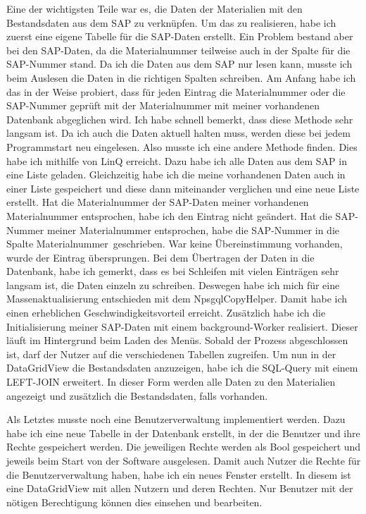 \documentclass{Vorlage}
\begin{document}
Eine der wichtigsten Teile war es, die Daten der Materialien mit den Bestandsdaten aus dem SAP zu
verknüpfen. Um das zu realisieren, habe ich zuerst eine eigene Tabelle für die SAP-Daten erstellt. 
Ein Problem bestand aber bei den SAP-Daten, da die Materialnummer teilweise auch in der Spalte für die 
SAP-Nummer stand. Da ich die Daten aus dem SAP nur lesen kann, musste ich beim Auslesen die Daten 
in die richtigen Spalten schreiben. Am Anfang habe ich das in der Weise probiert, dass für jeden Eintrag
die Materialnummer oder die SAP-Nummer geprüft mit der Materialnummer mit meiner vorhandenen Datenbank 
abgeglichen wird. Ich habe schnell bemerkt, dass diese Methode sehr langsam ist. Da ich auch die Daten 
aktuell halten muss, werden diese bei jedem Programmstart neu eingelesen. 
Also musste ich eine andere Methode finden. Dies habe ich mithilfe von LinQ erreicht.
Dazu habe ich alle Daten aus dem SAP in eine Liste geladen. Gleichzeitig habe ich die meine vorhandenen
Daten auch in einer Liste gespeichert und diese dann miteinander verglichen und eine neue Liste erstellt.
Hat die Materialnummer der SAP-Daten meiner vorhandenen Materialnummer entsprochen, habe ich den Eintrag 
nicht geändert. Hat die SAP-Nummer meiner Materialnummer entsprochen, habe die SAP-Nummer in die Spalte
\glqq Materialnummer\grqq \, geschrieben. War keine Übereinstimmung vorhanden, wurde der Eintrag übersprungen.
Bei dem Übertragen der Daten in die Datenbank, habe ich gemerkt, dass es bei Schleifen mit vielen Einträgen
sehr langsam ist, die Daten einzeln zu schreiben. Deswegen habe ich mich für eine Massenaktualisierung
entschieden mit dem NpsgqlCopyHelper.
Damit habe ich einen erheblichen Geschwindigkeitsvorteil erreicht. Zusätzlich habe ich die Initialisierung
meiner SAP-Daten mit einem background-Worker realisiert. Dieser läuft im Hintergrund beim Laden des Menüs.
Sobald der Prozess abgeschlossen ist, darf der Nutzer auf die verschiedenen Tabellen zugreifen.
Um nun in der DataGridView die Bestandsdaten anzuzeigen, habe ich die SQL-Query mit einem LEFT-JOIN 
erweitert. In dieser Form werden alle Daten zu den Materialien angezeigt und zusätzlich die Bestandsdaten,
falls vorhanden.

Als Letztes musste noch eine Benutzerverwaltung implementiert werden. Dazu habe ich eine neue Tabelle in der
Datenbank erstellt, in der die Benutzer und ihre Rechte gespeichert werden. Die jeweiligen Rechte werden
als Bool gespeichert und jeweils beim Start von der Software ausgelesen. Damit auch Nutzer die Rechte für
die Benutzerverwaltung haben, habe ich ein neues Fenster erstellt. In diesem ist eine DataGridView mit allen
Nutzern und deren Rechten. Nur Benutzer mit der nötigen Berechtigung können dies einsehen und bearbeiten.
\end{document}
